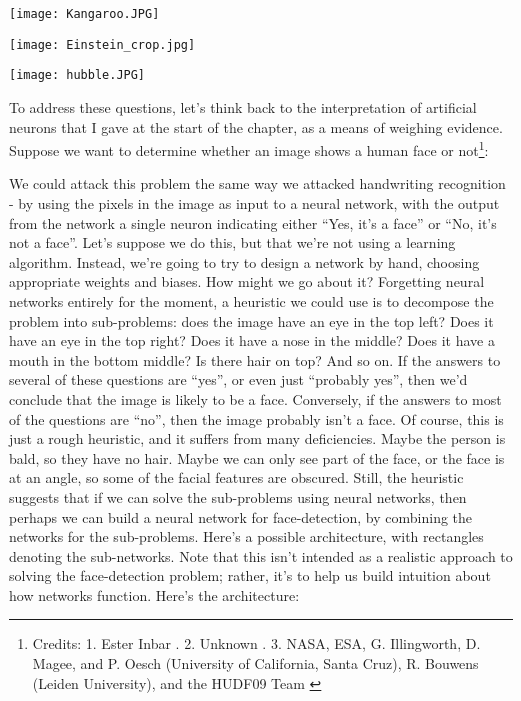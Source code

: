 \begin{marginfigure}[-226mm]
\texttt{[image: Kangaroo.JPG]}
\end{marginfigure}
\begin{marginfigure}[-118mm]
\texttt{[image: Einstein\_crop.jpg]}
\end{marginfigure}
\begin{marginfigure}[-40mm]
\texttt{[image: hubble.JPG]}
\end{marginfigure}

To address these questions, let's think back to the interpretation of artificial neurons that I gave at the start of the chapter, as a means of weighing evidence. Suppose we want to determine whether an image shows a human face or not\footnote{Credits: 1. Ester Inbar \cite{wikipediakangeroo2019}. 2. Unknown \cite{wikipediaeinsteinaged32019}. 3. NASA, ESA, G. Illingworth, D. Magee, and P. Oesch (University of California, Santa Cruz), R. Bouwens (Leiden University), and the HUDF09 Team \cite{wikipediahubblexdeepfield2019}}:




We could attack this problem the same way we attacked handwriting recognition - by using the pixels in the image as input to a neural network, with the output from the network a single neuron indicating either ``Yes, it's a face'' or ``No, it's not a face''.
Let's suppose we do this, but that we're not using a learning algorithm. Instead, we're going to try to design a network by hand, choosing appropriate weights and biases. How might we go about it? Forgetting neural networks entirely for the moment, a heuristic we could use is to decompose the problem into sub-problems: does the image have an eye in the top left? Does it have an eye in the top right? Does it have a nose in the middle? Does it have a mouth in the bottom middle? Is there hair on top? And so on.
If the answers to several of these questions are ``yes'', or even just ``probably yes'', then we'd conclude that the image is likely to be a face. Conversely, if the answers to most of the questions are ``no'', then the image probably isn't a face.
Of course, this is just a rough heuristic, and it suffers from many deficiencies. Maybe the person is bald, so they have no hair. Maybe we can only see part of the face, or the face is at an angle, so some of the facial features are obscured. Still, the heuristic suggests that if we can solve the sub-problems using neural networks, then perhaps we can build a neural network for face-detection, by combining the networks for the sub-problems. Here's a possible architecture, with rectangles denoting the sub-networks. Note that this isn't intended as a realistic approach to solving the face-detection problem; rather, it's to help us build intuition about how networks function. Here's the architecture:

